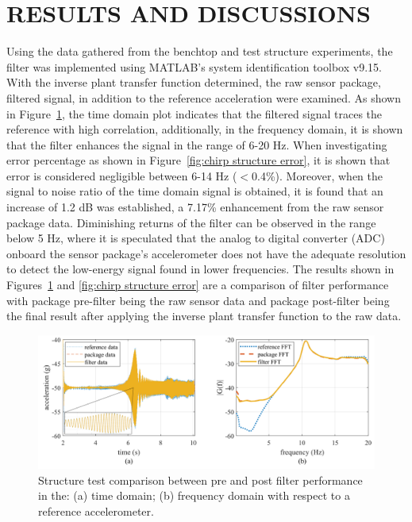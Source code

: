 \documentclass[]{spie}  %
\begin{document}
	\section{RESULTS AND DISCUSSIONS}
	Using the data gathered from the benchtop and test structure experiments, the filter was implemented using MATLAB’s system identification toolbox v9.15\cite{MAT2014}. With the inverse plant transfer function determined, the raw sensor package, filtered signal, in addition to the reference acceleration were examined. As shown in Figure~\ref{fig:Chrip Structure Test}, the time domain plot indicates that the filtered signal traces the reference with high correlation, additionally, in the frequency domain, it is shown that the filter enhances the signal in the range of 6-20 Hz. When investigating error percentage as shown in Figure~\ref{fig:chirp structure error}, it is shown that error is considered negligible between 6-14 Hz ($<$0.4\%). Moreover, when the signal to noise ratio of the time domain signal is obtained, it is found that an increase of 1.2 dB was established, a 7.17\% enhancement from the raw sensor package data. Diminishing returns of the filter can be observed in the range below 5 Hz, where it is speculated that the analog to digital converter (ADC) onboard the sensor package’s accelerometer does not have the adequate resolution to detect the low-energy signal found in lower frequencies. The results shown in Figures~\ref{fig:Chrip Structure Test} and \ref{fig:chirp structure error} are a comparison of filter performance with package pre-filter being the raw sensor data and package post-filter being the final result after applying the inverse plant transfer function to the raw data.
	
	\begin{figure} [H]
		\centering
		\includegraphics[width=6 in]{figures/Chrip Structure Test.png}
		\caption{Structure test comparison between pre and post filter performance in the: (a) time domain; (b) frequency domain with respect to a reference accelerometer.}
		\label{fig:Chrip Structure Test} 
	\end{figure} 
	
\end{document}
